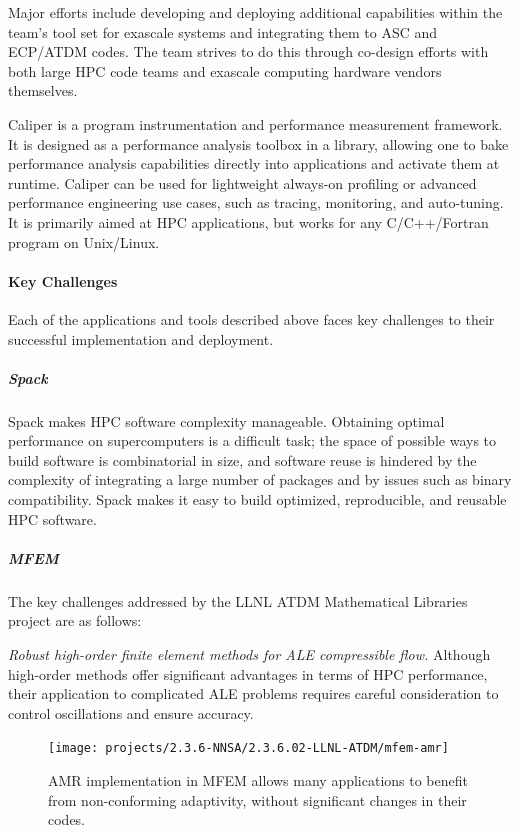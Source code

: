 Major efforts include developing and deploying additional capabilities
within the team’s tool set for exascale systems and integrating them to
ASC and ECP/ATDM codes. The team strives to do this through co-design
efforts with both large HPC code teams and exascale computing hardware
vendors themselves.

Caliper is a program instrumentation and performance measurement
framework. It is designed as a performance analysis toolbox in a library,
allowing one to bake performance analysis capabilities directly into
applications and activate them at runtime. Caliper can be used for
lightweight always-on profiling or advanced performance engineering use
cases, such as tracing, monitoring, and auto-tuning. It is primarily
aimed at HPC applications, but works for any C/C++/Fortran program on
Unix/Linux.


\paragraph{Key  Challenges} %
Each of the applications and tools described above faces key challenges to their successful implementation and deployment.

\subparagraph{Spack}
Spack makes HPC software complexity manageable. Obtaining optimal
performance on supercomputers is a difficult task; the space of possible
ways to build software is combinatorial in size, and software reuse is
hindered by the complexity of integrating a large number of packages and
by issues such as binary compatibility.  Spack makes it easy to build
optimized, reproducible, and reusable HPC software.

\subparagraph{MFEM}
The key challenges addressed by the LLNL ATDM Mathematical Libraries project are as follows:

\vspace {0.5 em}
\noindent
\textit{Robust high-order finite element methods for ALE compressible flow.}
Although high-order methods offer significant advantages in terms of HPC performance,
their application to complicated ALE problems requires careful consideration to
control oscillations and ensure accuracy.

\begin{figure}[htb]
\centering
\texttt{[image: projects/2.3.6-NNSA/2.3.6.02-LLNL-ATDM/mfem-amr]}
\caption{\label{fig:mfem-amr}AMR implementation in MFEM allows many applications to benefit
from non-conforming adaptivity, without significant changes in their codes.}
\end{figure}

